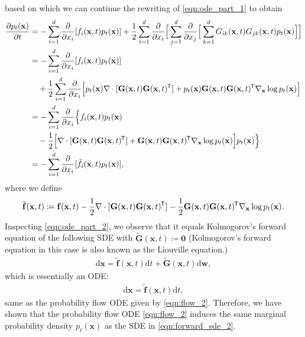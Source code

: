 \documentclass{article} %
\newcommand*{\tran}{^{\mkern-1.5mu\mathsf{T}}}
\newcommand{\ud}{\mathrm{d}}
\newcommand{\bfx}{\mathbf{x}}
\newcommand{\bfw}{\mathbf{w}}
\newcommand{\bff}{\mathbf{f}}
\newcommand{\bfzero}{\mathbf{0}}
\newcommand{\bfG}{\mathbf{G}}
\begin{document}
based on which we can continue the rewriting of \cref{eqn:ode_part_1} to obtain
\begin{align}
    \frac{\partial p_t(\bfx)}{\partial t} &= -\sum_{i=1}^d \frac{\partial}{\partial x_i}[f_i(\bfx, t) p_t(\bfx)] + \frac{1}{2}\sum_{i=1}^d \frac{\partial}{\partial x_i} \Big[ \sum_{j=1}^d \frac{\partial}{\partial x_j}\Big[\sum_{k=1}^d G_{ik}(\bfx, t) G_{jk}(\bfx, t) p_t(\bfx)\Big]\Big]\notag \\
     &= -\sum_{i=1}^d \frac{\partial}{\partial x_i}[f_i(\bfx, t) p_t(\bfx)] \notag \\
     &\quad + \frac{1}{2}\sum_{i=1}^d \frac{\partial}{\partial x_i} \Big[ p_t(\bfx) \nabla \cdot [\bfG(\bfx, t)\bfG(\bfx, t)\tran] + p_t(\bfx) \bfG(\bfx, t)\bfG(\bfx, t)\tran \nabla_\bfx \log p_t(\bfx) \Big]\notag \\
     &= -\sum_{i=1}^d \frac{\partial}{\partial x_i}\Big\{ f_i(\bfx, t)p_t(\bfx) \notag \\
     &\quad - \frac{1}{2} \Big[ \nabla \cdot [\bfG(\bfx, t)\bfG(\bfx, t)\tran] +  \bfG(\bfx, t)\bfG(\bfx, t)\tran \nabla_\bfx \log p_t(\bfx) \Big] p_t(\bfx) \Big\}\notag \\
     &= -\sum_{i=1}^d \frac{\partial}{\partial x_i} [\tilde{f}_i(\bfx, t)p_t(\bfx)],\label{eqn:ode_part_2}
\end{align}
where we define
\begin{align*}
    \tilde{\bff}(\bfx, t) \coloneqq \bff(\bfx, t) - \frac{1}{2} \nabla \cdot [\bfG(\bfx, t)\bfG(\bfx, t)\tran] - \frac{1}{2} \bfG(\bfx, t)\bfG(\bfx, t)\tran \nabla_\bfx \log p_t(\bfx).
\end{align*}
Inspecting \cref{eqn:ode_part_2}, we observe that it equals Kolmogorov's forward equation of the following SDE with $\tilde{\bfG}(\bfx, t) \coloneqq \bfzero$ (Kolmogorov's forward equation in this case is also known as the Liouville equation.)
\begin{align*}
    \ud \bfx = \tilde{\bff}(\bfx, t) \ud t + \tilde{\bfG}(\bfx, t) \ud \bfw,
\end{align*}
which is essentially an ODE:
\begin{align*}
    \ud \bfx = \tilde{\bff}(\bfx, t) \ud t,
\end{align*}
same as the probability flow ODE given by \cref{eqn:flow_2}. Therefore, we have shown that the probability flow ODE \cref{eqn:flow_2} induces the same marginal probability density $p_t(\bfx)$ as the SDE in \cref{eqn:forward_sde_2}.
\end{document}
